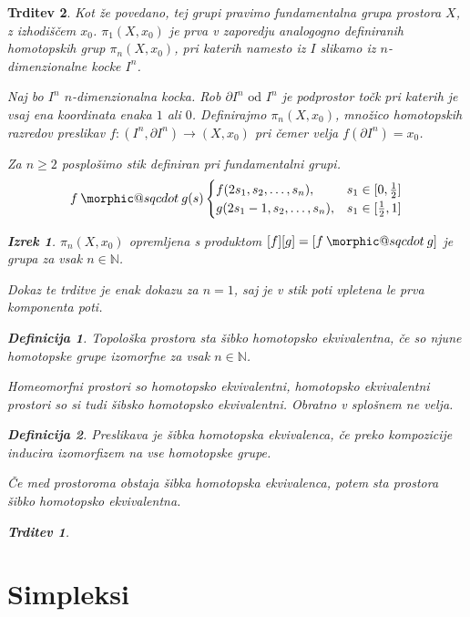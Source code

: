 \documentclass[a4paper,12pt]{article}
\makeatletter
\DeclareRobustCommand{\sqcdot}{\mathbin{\mathpalette\morphic@sqcdot\relax}}
\newcommand{\morphic@sqcdot}[2]{%
\sbox\z@{$\m@th#1\centerdot$}%
\ht\z@=.33333\ht\z@
\vcenter{\box\z@}%
}
\theoremstyle{definition}
\newtheorem{definicija}{Definicija}
\theoremstyle{plain}
\newtheorem{izrek}{Izrek}
\theoremstyle{definition}
\theoremstyle{plain}
\newtheorem{trditev}{Trditev}
\theoremstyle{plain}
\theoremstyle{plain}
\theoremstyle{plain}
\makeatother
\begin{document}
\begin{trditev}
Kot že povedano, tej grupi pravimo fundamentalna grupa prostora $X$, z izhodiščem $x_0$. $\pi_1(X,x_0)$ je prva v zaporedju analogogno definiranih homotopskih grup $\pi_n(X,x_0)$, pri katerih namesto iz $I$ slikamo iz $n$-dimenzionalne kocke $I^n$.


Naj bo $I^n$ $n$-dimenzionalna kocka. Rob $\partial I^n \text{ od } I^n$ je podprostor točk pri katerih je vsaj ena koordinata enaka $1$ ali $0$. Definirajmo $\pi_n(X,x_0)$, množico homotopskih razredov preslikav $f:(I^n,\partial I^n) \rightarrow (X,x_0)$ pri čemer velja $f(\partial I^n) = x_0$.


Za $n\ge 2$ posplošimo stik definiran pri fundamentalni grupi.
$$ f\sqcdot g(s) \begin{cases}
    f(2s_1,s_2,\ldots,s_n), & s_1\in [0,\frac{1}{2}] \\
    g(2s_1-1,s_2,\ldots,s_n), & s_1 \in [\frac{1}{2},1]
\end{cases}
$$

\begin{izrek}
    $\pi_n(X,x_0)$ opremljena s produktom $[f][g] = [f\sqcdot g]$ je grupa za vsak $n \in \mathds{N}$.
\end{izrek}

Dokaz te trditve je enak dokazu za $n=1$, saj je v stik poti vpletena le prva komponenta poti.

\begin{definicija}
    Topološka prostora sta \textit{šibko homotopsko ekvivalentna}, če so njune homotopske grupe izomorfne za vsak $n \in \mathds{N}$.
\end{definicija}

Homeomorfni prostori so homotopsko ekvivalentni, homotopsko ekvivalentni prostori so si tudi šibsko homotopsko ekvivalentni. Obratno v splošnem ne velja.

\begin{definicija}
    Preslikava je \textit{šibka homotopska ekvivalenca}, če preko kompozicije inducira izomorfizem na vse homotopske grupe.
\end{definicija}
Če med prostoroma obstaja šibka homotopska ekvivalenca, potem sta prostora šibko homotopsko ekvivalentna.

\begin{trditev}
    
\end{trditev}

\section{Simpleksi}


\end{trditev}
\end{document}

